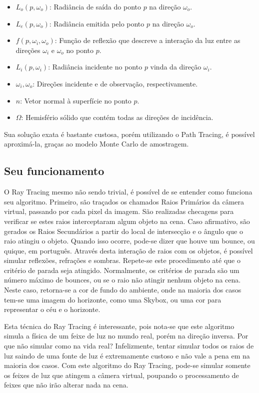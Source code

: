 \documentclass[journal]{IEEEtran}
\begin{document}
\vspace{10pt}
\begin{itemize}
  \item $L_o(p, \omega_o)$: Radiância de saída do ponto $p$ na direção $\omega_o$.
  \item $L_e(p, \omega_o)$: Radiância emitida pelo ponto $p$ na direção $\omega_o$.
  \item $f(p, \omega_i, \omega_o)$: Função de reflexão que descreve a interação da luz entre as direções $\omega_i$ e $\omega_o$ no ponto $p$.
  \item $L_i(p, \omega_i)$: Radiância incidente no ponto $p$ vinda da direção $\omega_i$.
  \item $\omega_i, \omega_o$: Direções incidente e de observação, respectivamente.
  \item $n$: Vetor normal à superfície no ponto $p$.
  \item $\Omega$: Hemisfério sólido que contém todas as direções de incidência.
\end{itemize}

Sua solução exata é bastante custosa, porém utilizando o Path Tracing, é possível
aproximá-la, graças ao modelo Monte Carlo de amostragem.

\subsection{Seu funcionamento}
O Ray Tracing mesmo não sendo trivial, é possível de se entender como funciona seu
algoritmo. Primeiro,
são traçados os chamados Raios Primários da câmera virtual, passando por cada pixel 
da imagem. São realizadas checagens para verificar se estes raios interceptaram algum 
objeto na cena.
Caso afirmativo, são gerados os Raios Secundários a partir do local de intersecção e
o ângulo que o raio atingiu o objeto. Quando isso ocorre, pode-se dizer que houve um
bounce, ou quique, em português. Através desta interação de raios com os objetos, é 
possível simular reflexões, refrações e sombras. Repete-se este procedimento até que
o critério de parada seja atingido. Normalmente, os critérios de parada são um número
máximo de bounces, ou se o raio não atingir nenhum objeto na cena. Neste caso, 
retorna-se a cor de fundo do ambiente, onde na maioria dos casos tem-se uma imagem
do horizonte, como uma Skybox, ou uma cor para representar o céu e o horizonte.

Esta técnica do Ray Tracing é interessante, pois nota-se que este algoritmo simula a física
de um feixe de luz no mundo real, porém na direção inversa. Por que não simular
como na vida real? Infelizmente, tentar simular todos os raios de luz saindo de uma fonte
de luz é extremamente custoso e não vale a pena em na maioria dos casos. Com este
algoritmo do Ray Tracing, pode-se simular somente os feixes de luz que atingem
a câmera virtual, poupando o processamento de feixes que não irão alterar nada
na cena. 
\end{document}
